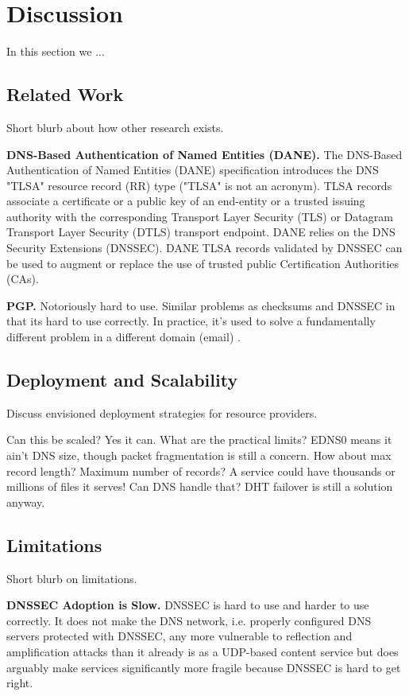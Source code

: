\section{Discussion} \label{sec:discussion}

In this section we ...

\subsection{Related Work}

Short blurb about how other research exists.

\textbf{DNS-Based Authentication of Named Entities (DANE).}    The DNS-Based
Authentication of Named Entities (DANE) specification \cite{DANE1, DANE2, DANE3}
introduces the DNS "TLSA" resource record (RR) type ("TLSA" is not an acronym).
TLSA records associate a certificate or a public key of an end-entity or a
trusted issuing authority with the corresponding Transport Layer Security (TLS)
or Datagram Transport Layer Security (DTLS) transport endpoint. DANE relies on
the DNS Security Extensions (DNSSEC). DANE TLSA records validated by DNSSEC can
be used to augment or replace the use of trusted public Certification
Authorities (CAs).

\textbf{PGP.}   Notoriously hard to use. Similar problems as checksums and
DNSSEC in that its hard to use correctly. In practice, it's used to solve a
fundamentally different problem in a different domain (email) \cite{OpenPGP1}.

\subsection{Deployment and Scalability}

Discuss envisioned deployment strategies for resource providers.

Can this be scaled? Yes it can. What are the practical limits? EDNS0 means it
ain't DNS size, though packet fragmentation is still a concern. How about max
record length? Maximum number of records? A service could have thousands or
millions of files it serves! Can DNS handle that? DHT failover is still a
solution anyway.

\subsection{Limitations}

Short blurb on limitations.

\textbf{DNSSEC Adoption is Slow.}    DNSSEC is hard to use and harder to use
correctly. It does not make the DNS network, i.e. properly configured DNS
servers protected with DNSSEC, any more vulnerable to reflection \cite{Neustar}
and amplification \cite{Ariya, DNSSEC-is-hard-1, DNSSEC-is-hard-2,
DNSSEC-is-hard-3, DNSSEC-is-hard-4} attacks than it already is as a UDP-based
content service \cite{USCERT, Vixie} but does arguably make services
significantly more fragile because DNSSEC is hard to get right.

